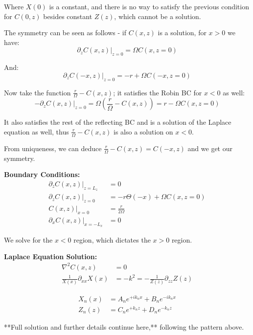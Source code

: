 \documentclass{article}
\begin{document}
Where $X(0)$ is a constant, and there is no way to satisfy the previous condition for $C(0,z)$ besides constant $Z(z)$, which cannot be a solution.

The symmetry can be seen as follows - if $C(x,z)$ is a solution, for $x>0$ we have:
\[
\partial_{z} C(x,z)|_{z=0} = \Omega C(x,z=0)
\]

And:
\[
\partial_{z} C(-x,z)|_{z=0} = -r + \Omega C(-x,z=0)
\]

Now take the function $\frac{r}{\Omega} - C(x,z)$; it satisfies the Robin BC for $x<0$ as well:
\[
-\partial_{z} C(x,z)|_{z=0} = \Omega \left(\frac{r}{\Omega} - C(x,z)\right) = r - \Omega C(x,z=0)
\]

It also satisfies the rest of the reflecting BC and is a solution of the Laplace equation as well, thus $\frac{r}{\Omega} - C(x,z)$ is also a solution on $x<0$.

From uniqueness, we can deduce $\frac{r}{\Omega} - C(x,z) = C(-x,z)$ and we get our symmetry.

\textbf{Boundary Conditions:}
\begin{align}
\partial_{z} C(x,z)|_{z=L_{z}} &= 0 \\
\partial_{z} C(x,z)|_{z=0} &= -r \Theta(-x) + \Omega C(x,z=0) \\
C(x,z)|_{x=0} &= \frac{r}{2 \Omega} \\
\partial_{x} C(x,z)|_{x=-L_{x}} &= 0
\end{align}

We solve for the $x<0$ region, which dictates the $x>0$ region.

\textbf{Laplace Equation Solution:}
\begin{align}
\nabla^{2} C(x,z) &= 0 \\
\frac{1}{X(x)} \partial_{xx} X(x) &= -k^{2} = -\frac{1}{Z(z)} \partial_{zz} Z(z)
\end{align}

\begin{align}
X_{n}(x) &= A_{n} e^{+ik_{n} x} + B_{n} e^{-ik_{n} x} \\
Z_{n}(z) &= C_{n} e^{+k_{n} z} + D_{n} e^{-k_{n} z}
\end{align}

**Full solution and further details continue here,** following the pattern above.
\end{document}
